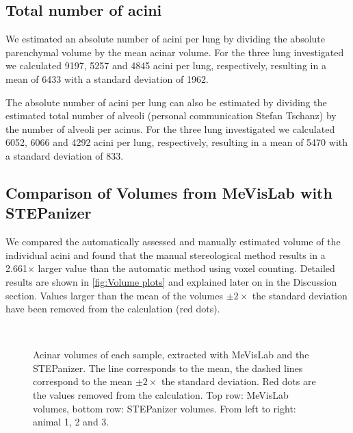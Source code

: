 \documentclass[draft,a4paper,DIVcalc,abstract,english]{scrartcl}
\newcommand{\biggerthan}{2} %
\newcommand{\totalnumberofaciniB}{9197}
\newcommand{\totalnumberofaciniD}{5257}
\newcommand{\totalnumberofaciniE}{4845}
\newcommand{\meantotalnumberofacini}{6433}
\newcommand{\meantotalnumberofaciniSTD}{1962} %
\newcommand{\totalnumberofaciniBVariant}{6052}
\newcommand{\totalnumberofaciniDVariant}{6066}
\newcommand{\totalnumberofaciniEVariant}{4292}
\newcommand{\meantotalnumberofaciniVariant}{5470}
\newcommand{\meantotalnumberofaciniSTDVariant}{833} %
\newcommand{\difference}{2.661} %
\begin{document}
\subsection{Total number of acini}
We estimated an absolute number of acini per lung by dividing the absolute parenchymal volume by the mean acinar volume.
For the three lung investigated we calculated \totalnumberofaciniB, \totalnumberofaciniD\xspace and \totalnumberofaciniE\xspace acini per lung, respectively, resulting in a mean of \meantotalnumberofacini\xspace with a standard deviation of \meantotalnumberofaciniSTD.

The absolute number of acini per lung can also be estimated by dividing the estimated total number of alveoli (personal communication Stefan Tschanz) by the number of alveoli per acinus.
For the three lung investigated we calculated \totalnumberofaciniBVariant, \totalnumberofaciniDVariant\xspace and \totalnumberofaciniEVariant\xspace acini per lung, respectively, resulting in a mean of \meantotalnumberofaciniVariant\xspace with a standard deviation of \meantotalnumberofaciniSTDVariant.

\subsection{Comparison of Volumes from MeVisLab with STEPanizer}
We compared the automatically assessed and manually estimated volume of the individual acini and found that the manual stereological method results in a \difference\(\times\) larger value than the automatic method using voxel counting.
Detailed results are shown in \autoref{fig:Volume plots} and explained later on in the Discussion section.
Values larger than the mean of the volumes \(\pm\biggerthan\times\) the standard deviation have been removed from the calculation (red dots).

\begin{figure}
	\centering
	\subfloat{
		}\hfill%
	\subfloat{
		
		}\hfill%
	\subfloat{
		
		}\\%
	\subfloat{
		
		}\hfill%
	\subfloat{
		
		}\hfill%
	\subfloat{
		
		}%
	\caption{Acinar volumes of each sample, extracted with MeVisLab and the STEPanizer. The line corresponds to the mean, the dashed lines correspond to the mean \(\pm\biggerthan\times\) the standard deviation. Red dots are the values removed from the calculation. Top row: MeVisLab volumes, bottom row: STEPanizer volumes. From left to right: animal 1, 2 and 3.}
	\label{fig:Volume plots}
\end{figure}
\end{document}

